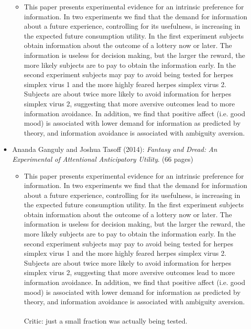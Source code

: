 \begin{itemize}
		\begin{itemize}
			\item This paper presents experimental evidence for an intrinsic preference for information. In two experiments we find that the demand for information about a future experience, controlling for its usefulness, is increasing in the expected future consumption utility. In the first experiment subjects obtain information about the outcome of a lottery now or later. The information is useless for decision making, but the larger the reward, the more likely subjects are to pay to obtain the information early. In the second experiment subjects may pay to avoid being tested for herpes simplex virus 1 and the more highly feared herpes simplex virus 2. Subjects are about twice more likely to avoid information for herpes simplex virus 2, suggesting that more aversive outcomes lead to more information avoidance. In addition, we find that positive affect (i.e. good mood) is associated with lower demand for information as predicted by theory, and information avoidance is associated with ambiguity aversion.
		\end{itemize}
	\item Ananda Ganguly and Joshua Tasoff (2014): \textit{Fantasy and Dread: An Experimental of Attentional Anticipatory Utility}. (66 pages)
		\begin{itemize}
			\item This paper presents experimental evidence for an intrinsic preference for information. In two experiments we find that the demand for information about a future experience, controlling for its usefulness, is increasing in the expected future consumption utility. In the first experiment subjects obtain information about the outcome of a lottery now or later. The information is useless for decision making, but the larger the reward, the more likely subjects are to pay to obtain the information early. In the second experiment subjects may pay to avoid being tested for herpes simplex virus 1 and the more highly feared herpes simplex virus 2. Subjects are about twice more likely to avoid information for herpes simplex virus 2, suggesting that more aversive outcomes lead to more information avoidance. In addition, we find that positive affect (i.e. good mood) is associated with lower demand for information as predicted by theory, and information avoidance is associated with ambiguity aversion. \\ \\
				
				Critic: just a small fraction was actually being tested. 
		\end{itemize}
\end{itemize}


\newpage